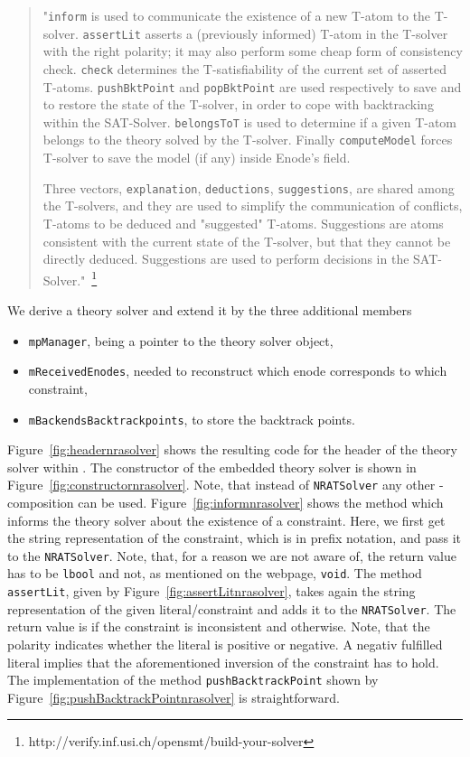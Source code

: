 \begin{quote}
	"\texttt{inform} is used to communicate the existence of a new T-atom to the T-solver. 
	\texttt{assertLit} asserts a (previously informed) T-atom in the T-solver with the right 
	polarity; it may also perform some cheap form of consistency check. 
	\texttt{check} determines the T-satisfiability of the current set of asserted T-atoms. 
	\texttt{pushBktPoint} and \texttt{popBktPoint} are used respectively to save and to restore 
	the state of the T-solver, in order to cope with backtracking within the 
	SAT-Solver. \texttt{belongsToT} is used to determine if a given T-atom belongs to 
	the theory solved by the T-solver. Finally \texttt{computeModel} forces T-solver to 
	save the model (if any) inside Enode's field.

	Three vectors, \texttt{explanation}, \texttt{deductions}, \texttt{suggestions}, are 
	shared among the T-solvers, and they are used to simplify the communication of conflicts, 
	T-atoms to be deduced and "suggested" T-atoms. Suggestions are atoms 
	consistent with the current state of the T-solver, but that they cannot be 
	directly deduced. Suggestions are used to perform decisions in the 
	SAT-Solver."~\footnote{http://verify.inf.usi.ch/opensmt/build-your-solver}
\end{quote}
\noindent We derive a theory solver and extend it by the three additional members
\begin{itemize}
	\item \texttt{mpManager}, being a pointer to the theory solver object, 
	\item \texttt{mReceivedEnodes}, needed to reconstruct which enode corresponds
		to which constraint,
	\item \texttt{mBackendsBacktrackpoints}, to store the backtrack points.
\end{itemize}
Figure~\ref{fig:headernrasolver} shows the resulting code for the header of the theory 
solver within \opensmt. The constructor of the embedded	theory solver is shown in 
Figure~\ref{fig:constructornrasolver}. Note, that instead of \texttt{NRATSolver} any other 
\smtrat-composition can be used. Figure~\ref{fig:informnrasolver}
shows the method which informs the theory solver about the existence of a constraint.
Here, we first get the string representation of the constraint, which is in prefix notation,
and pass it to the \texttt{NRATSolver}. Note, that, for a reason
we are not aware of, the return value has to be \texttt{lbool} and not, as mentioned on 
the webpage, \texttt{void}. The method \texttt{assertLit}, 
given by Figure~\ref{fig:assertLitnrasolver}, takes again the string representation of the given
literal/constraint and adds it to the \texttt{NRATSolver}. The return value is \false
if the constraint is inconsistent and \true otherwise. Note, that the polarity indicates
whether the literal is positive or negative. A negativ fulfilled literal implies that
the aforementioned inversion of the constraint has to hold. The implementation of the 
method \texttt{pushBacktrackPoint} shown by Figure~\ref{fig:pushBacktrackPointnrasolver}
is straightforward. 


